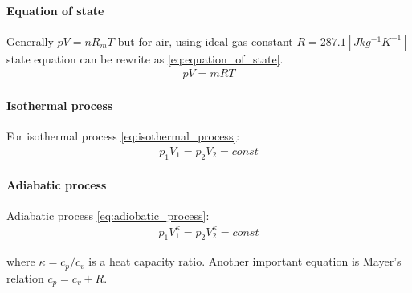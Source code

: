 \paragraph{Equation of state}
Generally $pV=nR_mT$ but for air, using ideal gas constant $R=287.1 [Jkg^{-1}K^{-1}]$
state equation can be rewrite as \ref{eq:equation_of_state}.
\begin{align}
    pV = mRT
    \label{eq:equation_of_state}
\end{align} 

\paragraph{Isothermal process}
For isothermal process \ref{eq:isothermal_process}:
\begin{align}
    p_1 V_1 = p_2 V_2 = const
    \label{eq:isothermal_process}
\end{align}

\paragraph{Adiabatic process}

Adiabatic process \ref{eq:adiobatic_process}:
\begin{align}
     p_1V_1^{\kappa} =  p_2V_2^{\kappa} = const
    \label{eq:adiobatic_process}
\end{align}

where $\kappa = c_p/c_v$ is a heat capacity ratio. Another
important equation is Mayer's relation $c_p = c_v + R$.


